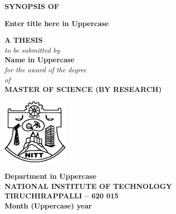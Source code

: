 \documentclass[12pt,a4paper]{article}
\theoremstyle{plain}
\theoremstyle{definition}
\begin{document}
\begin{titlepage}

\thispagestyle{empty}
\begin{center}
\thispagestyle{empty}
\normalsize
\textsc{\textbf{SYNOPSIS OF}}\\
\bigskip

\Large{\textbf{Enter title here in Uppercase}}\\

\bigskip \bigskip \bigskip \bigskip \bigskip \bigskip \bigskip \bigskip


\normalsize
\textbf{A THESIS}\\
\emph{to be submitted by}\\
\bigskip \bigskip \bigskip \bigskip
\normalsize
\textbf{Name in Uppercase}\\
\bigskip \bigskip \bigskip \bigskip
\emph{for the award of the degree}\\ \bigskip \bigskip
\emph{of}\\
\bigskip \bigskip
\normalsize
\textbf{MASTER OF SCIENCE (BY RESEARCH)}\\
\bigskip \bigskip \bigskip \bigskip \bigskip \bigskip \bigskip \bigskip
\centering

\includegraphics[width=32mm, height=32mm]{NITT.jpg}

\bigskip \bigskip
\normalsize
\textbf{Department in Uppercase} \\
\normalsize
\textbf{
NATIONAL INSTITUTE OF TECHNOLOGY\\
TIRUCHIRAPPALLI -- 620 015}\\ \bigskip
\normalsize
\textbf{Month (Uppercase) year}

\end{center}
\end{titlepage}



\end{document}
